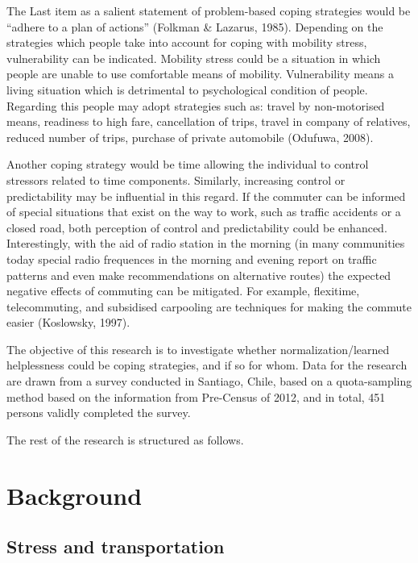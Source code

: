 \documentclass[
11pt, %
oneside, %
english, %
singlespacing, %
]{macthesis} %
\begin{document}
The Last item as a salient statement of problem-based coping strategies would be ``adhere to a plan of actions'' (Folkman \& Lazarus, 1985). Depending on the strategies which people take into account for coping with mobility stress, vulnerability can be indicated. Mobility stress could be a situation in which people are unable to use comfortable means of mobility. Vulnerability means a living situation which is detrimental to psychological condition of people. Regarding this people may adopt strategies such as: travel by non-motorised means, readiness to high fare, cancellation of trips, travel in company of relatives, reduced number of trips, purchase of private automobile (Odufuwa, 2008).

Another coping strategy would be time allowing the individual to control stressors related to time components. Similarly, increasing control or predictability may be influential in this regard. If the commuter can be informed of special situations that exist on the way to work, such as traffic accidents or a closed road, both perception of control and predictability could be enhanced. Interestingly, with the aid of radio station in the morning (in many communities today special radio frequences in the morning and evening report on traffic patterns and even make recommendations on alternative routes) the expected negative effects of commuting can be mitigated. For example, flexitime, telecommuting, and subsidised carpooling are techniques for making the commute easier (Koslowsky, 1997).

The objective of this research is to investigate whether normalization/learned helplessness could be coping strategies, and if so for whom. Data for the research are drawn from a survey conducted in Santiago, Chile, based on a quota-sampling method based on the information from Pre-Census of 2012, and in total, 451 persons validly completed the survey.

The rest of the research is structured as follows.

\hypertarget{background-1}{%
\section{Background}\label{background-1}}

\hypertarget{stress-and-transportation}{%
\subsection{Stress and transportation}\label{stress-and-transportation}}
\end{document}
